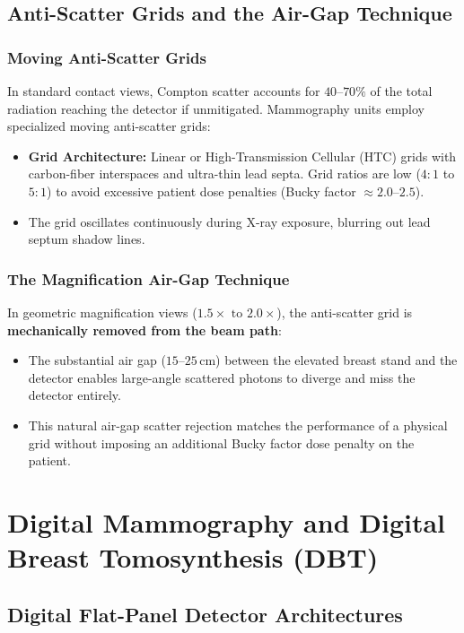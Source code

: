 \documentclass[11pt,a4paper]{article}
\begin{document}
\subsection{Anti-Scatter Grids and the Air-Gap Technique}

\subsubsection{Moving Anti-Scatter Grids}
In standard contact views, Compton scatter accounts for $40\text{--}70\%$ of the total radiation reaching the detector if unmitigated. Mammography units employ specialized moving anti-scatter grids:
\begin{itemize}[leftmargin=*]
    \item \textbf{Grid Architecture:} Linear or High-Transmission Cellular (HTC) grids with carbon-fiber interspaces and ultra-thin lead septa. Grid ratios are low ($4:1$ to $5:1$) to avoid excessive patient dose penalties (Bucky factor $\approx 2.0\text{--}2.5$).
    \item The grid oscillates continuously during X-ray exposure, blurring out lead septum shadow lines.
\end{itemize}

\subsubsection{The Magnification Air-Gap Technique}
In geometric magnification views ($1.5\times\text{ to }2.0\times$), the anti-scatter grid is \textbf{mechanically removed from the beam path}:
\begin{itemize}[leftmargin=*]
    \item The substantial air gap ($15\text{--}25\,\text{cm}$) between the elevated breast stand and the detector enables large-angle scattered photons to diverge and miss the detector entirely.
    \item This natural air-gap scatter rejection matches the performance of a physical grid without imposing an additional Bucky factor dose penalty on the patient.
\end{itemize}

\section{Digital Mammography and Digital Breast Tomosynthesis (DBT)}

\subsection{Digital Flat-Panel Detector Architectures}
\end{document}
